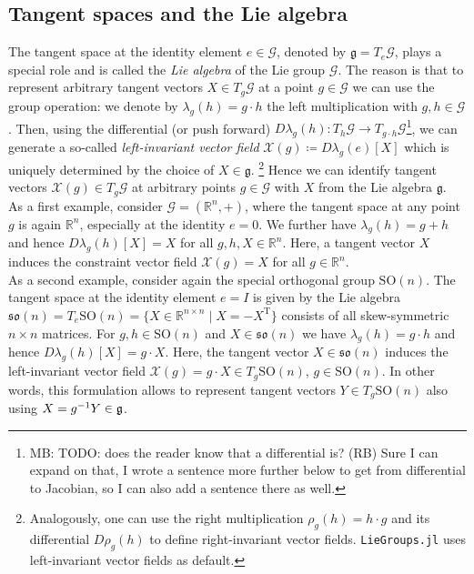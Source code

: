 \documentclass{juliacon}
\newcommand{\term}[1]{\emph{#1}}
\begin{document}
\subsection{Tangent spaces and the Lie algebra} The tangent space at the identity element \(e \in \mathcal{G}\), denoted by \(\mathfrak{g} = T_e\mathcal{G}\), plays a special role and is called the \term{Lie algebra} of the Lie group \(\mathcal{G}\).
The reason is that to represent arbitrary tangent vectors $X \in T_g\mathcal{G}$ at a point $g \in \mathcal{G}$ we can use the group operation: we denote by $\lambda_g(h) = g \cdot h$ the left multiplication with $g, h \in \mathcal{G}$.
Then, using the differential (or push forward) $D\lambda_g(h)\colon T_h\mathcal G \to T_{g\cdot h}\mathcal G$\footnote{\color{red} MB: TODO: does the reader know that a differential is? (RB) Sure I can expand on that, I wrote a sentence more further below to get from differential to Jacobian, so I can also add a sentence there as well.}, we can generate a so-called \term{left-invariant vector field} $\mathcal X(g) \coloneqq D\lambda_g(e)[X]$ which is uniquely determined by the choice of $X \in \mathfrak{g}$.%
\footnote{Analogously, one can use the right multiplication $\rho_g(h) = h \cdot g$ and its differential $D\rho_g(h)$ to define right-invariant vector fields. \texttt{LieGroups.jl} uses left-invariant vector fields as default.}%
Hence we can identify tangent vectors $\mathcal X(g) \in T_g\mathcal G$ at arbitrary points $g \in \mathcal G$ with $X$ from the Lie algebra $\mathfrak{g}$.
\\
As a first example, consider $\mathcal G = (\mathbb R^n, +)$, where the tangent space at any point $g$ is again $\mathbb R^n$, especially at the identity $e=0$. We further have $\lambda_g(h) = g + h$ and hence $D\lambda_g(h)[X] = X$ for all $g, h, X \in \mathbb R^n$.
Here, a tangent vector $X$ induces the constraint vector field $\mathcal X(g) = X$ for all $g \in \mathbb R^n$.\\
As a second example, consider again the special orthogonal group $\mathrm{SO}(n)$.
The tangent space at the identity element $e = I$ is given by the Lie algebra $\mathfrak{so}(n) = T_e\mathrm{SO}(n) = \{ X \in \mathbb{R}^{n \times n} \mid X = -X^{\mathrm{T}} \}$ consists of all skew-symmetric $n \times n$ matrices.
For $g, h \in \mathrm{SO}(n)$ and $X \in \mathfrak{so}(n)$ we have $\lambda_g(h) = g \cdot h$ and hence $D\lambda_g(h)[X] = g \cdot X$. Here, the tangent vector $X \in \mathfrak{so}(n)$ induces the left-invariant vector field $\mathcal X(g) = g \cdot X \in T_g\mathrm{SO}(n)$, $g \in \mathrm{SO}(n)$.
In other words, this formulation allows to represent tangent vectors $Y\in T_g\mathrm{SO}(n)$ also using $X = g^{-1}Y \in \frak{g}$.
\end{document}
